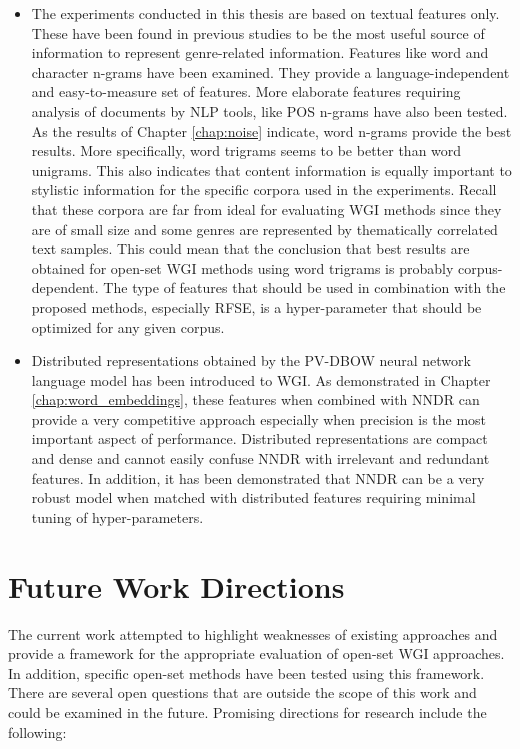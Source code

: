 \begin{itemize}
    \item The experiments conducted in this thesis are based on textual features only. These have been found in previous studies to be the most useful source of information to represent genre-related information. Features like word and character n-grams have been examined. They provide a language-independent and easy-to-measure set of features. More elaborate features requiring analysis of documents by NLP tools, like POS n-grams have also been tested. As the results of Chapter \ref{chap:noise} indicate, word n-grams provide the best results. More specifically, word trigrams seems to be better than word unigrams. This also indicates that content information is equally important to stylistic information for the specific corpora used in the experiments. Recall that these corpora are far from ideal for evaluating WGI methods since they are of small size and some genres are represented by thematically correlated text samples. This could mean that the conclusion that best results are obtained for open-set WGI methods using word trigrams is probably corpus-dependent. The type of features that should be used in combination with the proposed methods, especially RFSE, is a hyper-parameter that should be optimized for any given corpus.
    \item Distributed representations obtained by the PV-DBOW neural network language model has been introduced to WGI. As demonstrated in Chapter \ref{chap:word_embeddings}, these features when combined with NNDR can provide a very competitive approach especially when precision is the most important aspect of performance. Distributed representations are compact and dense and cannot easily confuse NNDR with irrelevant and redundant features. In addition, it has been demonstrated that NNDR can be a very robust model when matched with distributed features requiring minimal tuning of hyper-parameters.
\end{itemize}

\section{Future Work Directions}

The current work attempted to highlight weaknesses of existing approaches and provide a framework for the appropriate evaluation of open-set WGI approaches. In addition, specific open-set methods have been tested using this framework. There are several open questions that are outside the scope of this work and could be examined in the future. Promising directions for research include the following:

